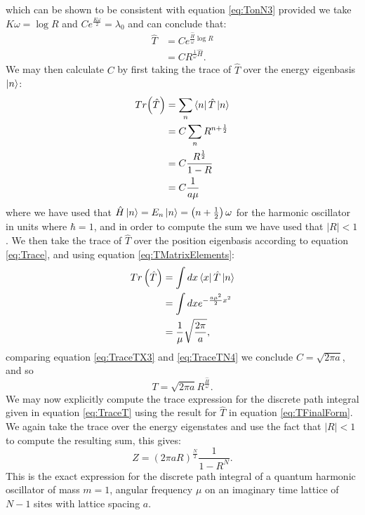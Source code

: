 \documentclass[12pt]{article}
\begin{document}
        which can be shown to be consistent with equation \ref{eq:TonN3} provided we take $K\omega=\log R$ and $Ce^{\frac{K\omega}{2}}=\lambda_0$ and can conclude that:
        \begin{align}
            \label{eq:TWithC1} \hat{T} & = Ce^{\frac{\hat{H}}{\omega}\log R } \\
            \label{eq:TWithC2}         & = CR^{\frac{1}{\omega}\hat{H}}.
        \end{align}
        We may then calculate $C$ by first taking the trace of $\hat{T}$ over the energy eigenbasis $\ket{n}$:
        \begin{align}
            \label{eq:TraceTN1} Tr{\left(\hat{T}\right)} & = \sum_{n}\bra{n}\hat{T}\ket{n} \\
            \label{eq:TraceTN2}                          & = C\sum_n R^{n+\frac{1}{2}} \\
            \label{eq:TraceTN3}                          & = C \frac{R^{\frac{1}{2}}}{1-R}\\
            \label{eq:TraceTN4}                          & = C\frac{1}{a\mu}
        \end{align}
        where we have used that $\hat{H}\ket{n} = E_n\ket{n} = \left(n+\frac{1}{2}\right)\omega$ for the harmonic oscillator in units where $\hbar=1$, and in order to compute the sum we have used that $|R| < 1$.
        We then take the trace of $\hat{T}$ over the position eigenbasis according to equation \ref{eq:Trace}, and using equation \ref{eq:TMatrixElements}:
        \begin{align}
            \label{eq:TraceTX1} Tr\left(\hat{T}\right) & = \int dx \bra{x}\hat{T}\ket{n} \\ 
            \label{eq:TraceTX2}                        & = \int dx e^{-\frac{a\mu^2}{2}x^2} \\
            \label{eq:TraceTX3}                        & = \frac{1}{\mu}\sqrt{\frac{2\pi}{a}},
        \end{align}
        comparing equation \ref{eq:TraceTX3} and \ref{eq:TraceTN4} we conclude $C=\sqrt{2\pi a}$, and so 
        \begin{equation}
            \label{eq:TFinalForm}
            T = \sqrt{2\pi a} R^{\frac{\hat{H}}{\omega}}.
        \end{equation}
        We may now explicitly compute the trace expression for the discrete path integral given in equation \ref{eq:TraceT} using the result for $\hat{T}$ in equation \ref{eq:TFinalForm}. We again take the trace over the energy eigenstates and use the fact that $|R|<1$ to compute the resulting sum, this gives:
        \begin{equation}
            \label{eq:DiscretePathIntegralExactForm}
            Z = \left(2\pi aR\right)^{\frac{N}{2}}\frac{1}{1-R^N}.
        \end{equation}
        This is the exact expression for the discrete path integral of a quantum harmonic oscillator of mass $m=1$, angular frequency $\mu$ on an imaginary time lattice of $N-1$ sites with lattice spacing $a$.
\end{document}
